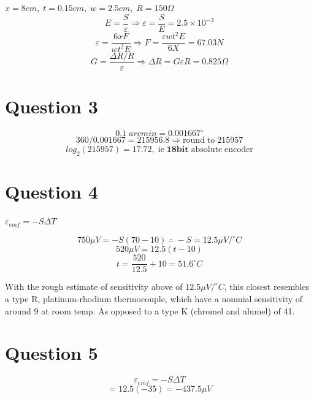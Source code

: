\documentclass[11pt]{article}
\begin{document}
$x=8cm,\;t=0.15cm,\;w=2.5cm,\;R=150\Omega$
$$E=\frac{S}{\varepsilon} \Rightarrow \varepsilon =\frac{S}{E} = 2.5{\times}10^{-3}$$
$$\varepsilon = \frac{6xF}{wt^2E} \Rightarrow F = \frac{{\varepsilon}wt^2E}{6X} = 67.03N$$
$$G = \frac{{\Delta}R/R}{\varepsilon} \Rightarrow {\Delta}R = G{\varepsilon}R = 0.825\Omega$$
\section*{Question 3}
$$0.1\;arcmin = 0.001667^{\circ}$$
$$360/0.001667 = 215956.8 \Rightarrow \mathrm{round\;to\;} 215957$$
$$log_2(215957) = 17.72,\;\mathrm{ie\;\textbf{18bit}\;absolute\;encoder}$$
\section*{Question 4}
$\varepsilon_{emf} = -S{\Delta}T$

$$750{\mu}V = -S(70-10)\;\therefore\;-S=12.5{\mu}V/^{\circ}C$$
$$520{\mu}V = 12.5(t-10)$$
$$t = \frac{520}{12.5}+10 = 51.6^{\circ}C$$

With the rough estimate of sensitivity above of $12.5{\mu}V/^{\circ}C$, this closest resembles a type R, platinum-rhodium thermocouple, which have a nomnial sensitivity of around 9 at room temp. As opposed to a type K (chromel and alumel) of 41.
\section*{Question 5}
$$\varepsilon_{emf} = -S{\Delta}T$$
$$= 12.5(-35)=-437.5{\mu}V$$
\end{document}
